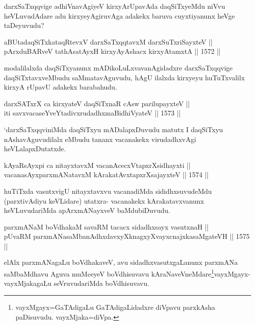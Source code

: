 \begin{artha}
darxSaTxqqvige adhiVnavAgiyeV kirxyArUpavAda daqSiTxyeMdu niVvu heVLuvudAdare adu kirxyeyAgiruvAga adakekx baruva cuyxtiyanunx heVge taDeyuvudu?
\end{artha}

\begin{shl}
aBUtadaqSiTxkataqRtevxV darxSaTxqqtavxM darxSuTxriSayxteV ||  \\
pArxduBARveV tathA\s satAyxH kirxyAyAshacx kirxyAtamxtA ||  1572 ||  
\end{shl}

\begin{artha}
modalilalxda daqSiTxyanunx mADikoLuLxvavanAgidadxre darxSaTxqqvige daqSiTxtavxveMbudu saMmatavAguvudu, hAgU ilalxda kirxyeyu huTuTxvalilx kirxyA rUpavU adakekx barabahudu.
\end{artha}


\begin{shl}
darxSATxrX ca kirxyateV daqSiTxnaR cAsw parilupayxteV || \\
iti savxvacaseYveYtadivxrudadhxmaBidhiVyateV ||  1573 ||  
\end{shl}

\begin{artha}
`darxSaTxqqviniMda daqSiTxyu mADalapxDuvudu matutx I daqSiTxyu nAshavAguvudilalx eMbudu tananx vacanakekx virudadhxvAgi heVLalapxDutatxde.
\end{artha}


\begin{shl}
kAyaRsAyxpi ca nitayxtavxM vacanAcecxVtapxrXsidhayxti ||  \\
vacanasAyxparxmANatavxM kArakatAvxtapxrXsajayxteV ||  1574 ||  
\end{shl}

\begin{artha}
huTiTxda vasutxvigU nitayxtavxvu vacanadiMda sididhxsuvudeMdu (parxtivAdiyu keVLidare) utatxra- vacanakekx kArakatavxvanunx heVLuvudariMda apArxmANayxveV baMdubiDuvudu.
\end{artha}

\begin{shl}
parxmANaM boVdhakaM savaRM tacacx sidadhxsayx vasutxnaH || \\
pUvaRM parxmANasaMbanAdhxdavxyXknagxyXvayxcnajxkasaMgateVH ||  1575 ||  
\end{shl}

\begin{artha}
elAlx parxmANagaLu boVdhakaveV, avu sidadhxvasutxgaLanunx parxmANa saMbaMdhavu Aguva muMceyeV boVdhisuvavu kAraNaveVneMdare\footnote{vayxMgayx=GaTAdigaLu GaTAdigaLidadxre diVpavu parxkAsha paDisuvudu. vayxMjaka=diVpa.}vayxMgayx-vayxMjakagaLu seVruvudariMda boVdhisuvavu.
\end{artha} 

